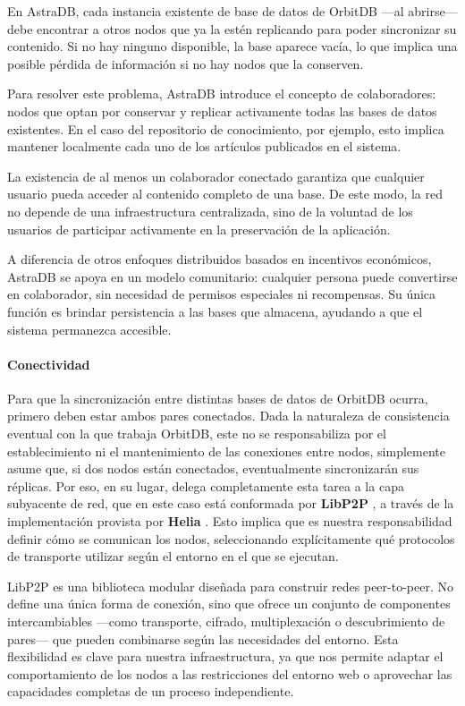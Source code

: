En AstraDB, cada instancia existente de base de datos de OrbitDB —al abrirse— debe encontrar a otros nodos que ya la estén replicando para poder sincronizar su contenido. Si no hay ninguno disponible, la base aparece vacía, lo que implica una posible pérdida de información si no hay nodos que la conserven.

Para resolver este problema, AstraDB introduce el concepto de colaboradores: nodos que optan por conservar y replicar activamente todas las bases de datos existentes. En el caso del repositorio de conocimiento, por ejemplo, esto implica mantener localmente cada uno de los artículos publicados en el sistema.

La existencia de al menos un colaborador conectado garantiza que cualquier usuario pueda acceder al contenido completo de una base. De este modo, la red no depende de una infraestructura centralizada, sino de la voluntad de los usuarios de participar activamente en la preservación de la aplicación.

A diferencia de otros enfoques distribuidos basados en incentivos económicos, AstraDB se apoya en un modelo comunitario: cualquier persona puede convertirse en colaborador, sin necesidad de permisos especiales ni recompensas. Su única función es brindar persistencia a las bases que almacena, ayudando a que el sistema permanezca accesible.

\paragraph{Conectividad}

Para que la sincronización entre distintas bases de datos de OrbitDB ocurra, primero deben estar ambos pares conectados. Dada la naturaleza de consistencia eventual con la que trabaja OrbitDB, este no se responsabiliza por el establecimiento ni el mantenimiento de las conexiones entre nodos, simplemente asume que, si dos nodos están conectados, eventualmente sincronizarán sus réplicas.  Por eso, en su lugar, delega completamente esta tarea a la capa subyacente de red, que en este caso está conformada por \textbf{LibP2P} \cite{libp2p}, a través de la implementación provista por \textbf{Helia} \cite{helia}. Esto implica que es nuestra responsabilidad definir cómo se comunican los nodos, seleccionando explícitamente qué protocolos de transporte utilizar según el entorno en el que se ejecutan.

LibP2P es una biblioteca modular diseñada para construir redes peer-to-peer. No define una única forma de conexión, sino que ofrece un conjunto de componentes intercambiables —como transporte, cifrado, multiplexación o descubrimiento de pares— que pueden combinarse según las necesidades del entorno. Esta flexibilidad es clave para nuestra infraestructura, ya que nos permite adaptar el comportamiento de los nodos a las restricciones del entorno web o aprovechar las capacidades completas de un proceso independiente.

